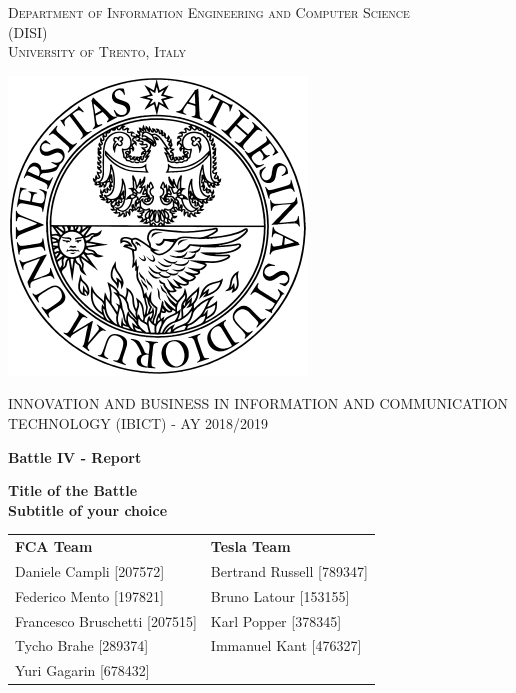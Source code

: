 \begin{titlepage}
	\begin{center}
   	{\scshape\LARGE
    	Department of Information Engineering and Computer Science\\ 
      	(DISI)\\ 
      	University of Trento, Italy\\\par}
      	\vspace{1cm}
      	\includegraphics[scale=0.5]{resources/logo}\\
	\vspace{1cm}
	{\scshape\Large INNOVATION AND BUSINESS IN INFORMATION AND COMMUNICATION TECHNOLOGY (IBICT) - AY 2018/2019\par}
	\vspace{1.5cm}
	{\huge\bfseries Battle IV - Report\\\par}
	\vspace{1cm}
	{\Large\bfseries Title of the Battle\\
	Subtitle of your choice\par}
      	\vfill
        \begin{tabular}{ll}
        \textbf{FCA Team}           &       \textbf{Tesla Team}         \\
       	Daniele Campli [207572]     &       Bertrand Russell [789347]   \\
	    Federico Mento [197821]     &       Bruno Latour [153155]       \\
	    Francesco Bruschetti [207515]       &       Karl Popper [378345]        \\
	    Tycho Brahe [289374]        &       Immanuel Kant [476327]      \\
	    Yuri Gagarin [678432]        &           \\
        \end{tabular}
      	\vfill
      	\vfill
	\end{center}
\end{titlepage}
